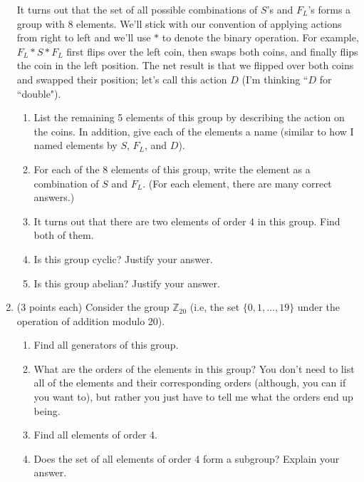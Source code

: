 \documentclass[11pt]{article}
\theoremstyle{definition}
\begin{document}
\begin{enumerate}
It turns out that the set of all possible combinations of $S$'s and $F_L$'s forms a group with 8 elements.  We'll stick with our convention of applying actions from right to left and we'll use $*$ to denote the binary operation.  For example, $F_L*S*F_L$ first flips over the left coin, then swaps both coins, and finally flips the coin in the left position.  The net result is that we flipped over both coins and swapped their position; let's call this action $D$ (I'm thinking ``$D$ for ``double").

\begin{enumerate}

\item List the remaining 5 elements of this group by describing the action on the coins.  In addition, give each of the elements a name (similar to how I named elements by $S$, $F_L$, and $D$).

\item For each of the 8 elements of this group, write the element as a combination of $S$ and $F_L$.  (For each element, there are many correct answers.)

\item It turns out that there are two elements of order 4 in this group.  Find both of them.

\item Is this group cyclic?  Justify your answer.

\item Is this group abelian?  Justify your answer.

\end{enumerate}

\item (3 points each) Consider the group $\mathbb{Z}_{20}$ (i.e, the set $\{0, 1,\ldots, 19\}$ under the operation of addition modulo 20).
\begin{enumerate}

\item Find all generators of this group.

\item What are the orders of the elements in this group?  You don't need to list all of the elements and their corresponding orders (although, you can if you want to), but rather you just have to tell me what the orders end up being.

\item Find all elements of order 4.

\item Does the set of all elements of order 4 form a subgroup?  Explain your answer.

\end{enumerate}

\end{enumerate}
\end{document}
